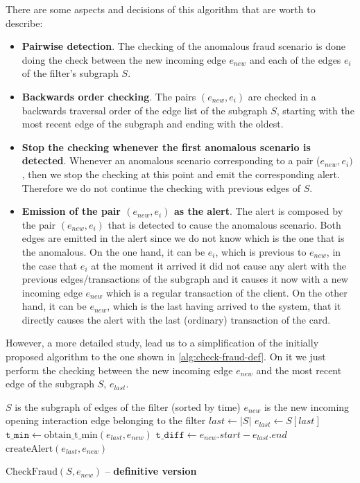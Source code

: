\documentclass{article}
\begin{document}
There are some aspects and decisions of this algorithm that are worth to describe:

\begin{itemize}
    \item \textbf{Pairwise detection}. The checking of the anomalous fraud scenario is done doing the check between the new incoming edge $e_{new}$ and each of the edges $e_i$ of the filter's subgraph $S$.
    \item \textbf{Backwards order checking}. The pairs $(e_{new}, e_i)$ are checked in a backwards traversal order of the edge list of the subgraph $S$, starting with the most recent edge of the subgraph and ending with the oldest.  
    \item \textbf{Stop the checking whenever the first anomalous scenario is detected}. Whenever an anomalous scenario corresponding to a pair ($e_{new}, e_i)$, then we stop the checking at this point and emit the corresponding alert. Therefore we do not continue the checking with previous edges of $S$. 
    \item \textbf{Emission of the pair $(e_{new}, e_i)$ as the alert}. The alert is composed by the pair $(e_{new}, e_i)$ that is detected to cause the anomalous scenario. Both edges are emitted in the alert since we do not know which is the one that is the anomalous. On the one hand, it can be $e_i$, which is previous to $e_{new}$, in the case that $e_i$ at the moment it arrived it did not cause any alert with the previous edges/transactions of the subgraph and it causes it now with a new incoming edge $e_{new}$ which is a regular transaction of the client. On the other hand, it can be $e_{new}$, which is the last having arrived to the system, that it directly causes the alert with the last (ordinary) transaction of the card.
\end{itemize}

However, a more detailed study, lead us to a simplification of the initially proposed algorithm to the one shown in \ref{alg:check-fraud-def}. On it we just perform the checking between the new incoming edge $e_{new}$ and the most recent edge of the subgraph $S$, $e_{last}$.

\begin{algorithm}[H]
  \small
  \begin{algorithmic}[1]
  \REQUIRE $S$ is the subgraph of edges of the filter (sorted by time)
  \REQUIRE $e_{new}$ is the new incoming opening interaction edge belonging to the filter 
  \STATE $last \gets |S|$
  \STATE $e_{last} \gets S[last]$
  \STATE $\texttt{t\_min} \gets \text{obtain\_t\_min}(e_{last}, e_{new})$
  \STATE $\texttt{t\_diff} \gets e_{new}.start - e_{last}.end$
    \STATE $\text{createAlert}(e_{last}, e_{new})$
  \ENDIF
  \end{algorithmic}
  \caption{$\text{CheckFraud}(S, e_{new})$ -- \textbf{definitive version}}
  \label{alg:check-fraud-def}
\end{algorithm}
\end{document}
